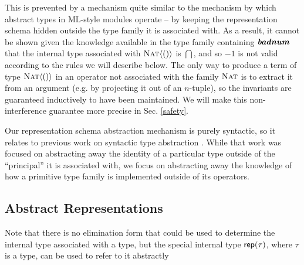 \documentclass{llncs}
\begin{document}
This is prevented by a mechanism quite similar to the mechanism by which abstract types in ML-style modules operate \cite{atapl} -- by keeping the representation schema hidden outside the type family it is associated with. As a result, it cannot be shown given the knowledge available in the type family containing $\textbf{\textit{badnum}}$ that the internal type associated with $\textsc{Nat}\langle()\rangle$ is $\dint$, and so $-1$ is not valid according to the rules we will describe below. The only way to produce a term of type $\textsc{Nat}\langle()\rangle$ in an operator not associated with the family $\textsc{Nat}$ is to extract it from an argument (e.g. by projecting it out of an $n$-tuple), so the invariants are guaranteed inductively to have been  maintained. We will make this non-interference guarantee more precise in Sec. \ref{safety}.

Our representation schema abstraction mechanism is purely syntactic, so it relates to previous work on syntactic type abstraction \cite{syntypeabs}. While that work was focused on abstracting away the identity of a particular type outside of the ``principal'' it is associated with, we focus on abstracting away the knowledge of how a primitive type family is implemented outside of its operators.


\subsection{Abstract Representations}
Note that there is no elimination form that could be used to determine the internal type associated with a type, but the special internal type ${\sf rep}(\tau)$, where $\tau$ is a type, can be used to refer to it abstractly
\end{document}
